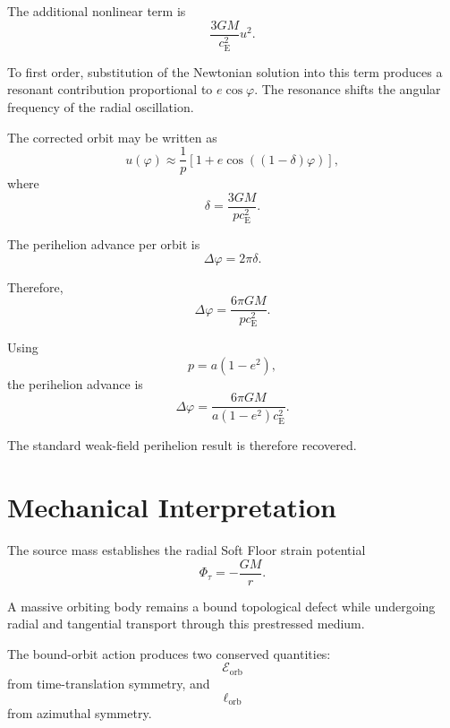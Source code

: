 The additional nonlinear term is
\begin{equation}
    \frac{3GM}{c_{\mathrm{E}}^2}u^2.
\end{equation}

To first order, substitution of the Newtonian solution into this term produces a resonant contribution proportional to $e\cos\varphi$. The resonance shifts the angular frequency of the radial oscillation.

The corrected orbit may be written as
\begin{equation}
    u(\varphi) \approx \frac{1}{p} \left[ 1+ e\cos \left( (1-\delta)\varphi \right) \right],
\end{equation}
where
\begin{equation}
    \delta = \frac{3GM}{pc_{\mathrm{E}}^2}.
\end{equation}

The perihelion advance per orbit is
\begin{equation}
    \Delta\varphi = 2\pi\delta.
\end{equation}

Therefore,
\begin{equation}
    \Delta\varphi = \frac{6\pi GM} {pc_{\mathrm{E}}^2}.
\end{equation}

Using
\begin{equation}
    p = a(1-e^2),
\end{equation}
the perihelion advance is
\begin{equation}
    \boxed{ \Delta\varphi = \frac{ 6\pi GM }{ a(1-e^2)c_{\mathrm{E}}^2 } }.
\end{equation}

The standard weak-field perihelion result is therefore recovered.

\section{Mechanical Interpretation}

The source mass establishes the radial Soft Floor strain potential
\begin{equation}
    \Phi_\tau = -\frac{GM}{r}.
\end{equation}

A massive orbiting body remains a bound topological defect while undergoing radial and tangential transport through this prestressed medium.

The bound-orbit action produces two conserved quantities:
\begin{equation}
    \mathcal{E}_{\mathrm{orb}}
\end{equation}
from time-translation symmetry, and
\begin{equation}
    \ell_{\mathrm{orb}}
\end{equation}
from azimuthal symmetry.

